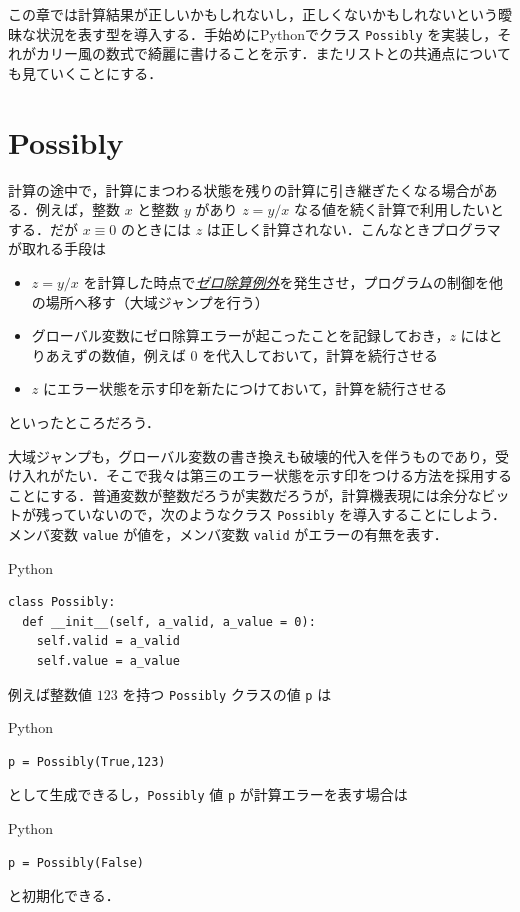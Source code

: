 \documentclass[a4paper]{jsbook}
\newcommand{\programminglanguage}[1]{\textsf{#1}}
\newcommand{\python}{\programminglanguage{Python}}
\newenvironment{leader}{\begingroup}{\endgroup}
\newcommand{\keyword}[1]{{\underline{\emph{#1}}}}
\newcommand{\code}[1]{\texttt{#1}}
\newenvironment{pythoncode}{\begin{itembox}[r]{\python}}{\end{itembox}}
\begin{document}
\begin{leader}
この章では計算結果が正しいかもしれないし，正しくないかもしれないという曖昧な状況を表す型を導入する．手始めに\python でクラス \code{Possibly} を実装し，それがカリー風の数式で綺麗に書けることを示す．またリストとの共通点についても見ていくことにする．
\end{leader}

\section{Possibly}

計算の途中で，計算にまつわる状態を残りの計算に引き継ぎたくなる場合がある．例えば，整数 $x$ と整数 $y$ があり $z=y/x$ なる値を続く計算で利用したいとする．だが $x\equiv0$ のときには $z$ は正しく計算されない．こんなときプログラマが取れる手段は
\begin{itemize}
\item $z=y/x$ を計算した時点で\keyword{ゼロ除算例外}を発生させ，プログラムの制御を他の場所へ移す（大域ジャンプを行う）
\item グローバル変数にゼロ除算エラーが起こったことを記録しておき，$z$ にはとりあえずの数値，例えば $0$ を代入しておいて，計算を続行させる
\item $z$ にエラー状態を示す印を新たにつけておいて，計算を続行させる
\end{itemize}
といったところだろう．

大域ジャンプも，グローバル変数の書き換えも破壊的代入を伴うものであり，受け入れがたい．そこで我々は第三のエラー状態を示す印をつける方法を採用することにする．普通変数が整数だろうが実数だろうが，計算機表現には余分なビットが残っていないので，次のようなクラス \code{Possibly} を導入することにしよう．メンバ変数 \code{value} が値を，メンバ変数 \code{valid} がエラーの有無を表す．
\begin{pythoncode}
\begin{verbatim}
class Possibly:
  def __init__(self, a_valid, a_value = 0):
    self.valid = a_valid
    self.value = a_value
\end{verbatim}
\end{pythoncode}

例えば整数値 $123$ を持つ \code{Possibly} クラスの値 \code{p} は
\begin{pythoncode}
\begin{verbatim}
p = Possibly(True,123)
\end{verbatim}
\end{pythoncode}
として生成できるし，\code{Possibly} 値 \code{p} が計算エラーを表す場合は
\begin{pythoncode}
\begin{verbatim}
p = Possibly(False)
\end{verbatim}
\end{pythoncode}
と初期化できる．
\end{document}

